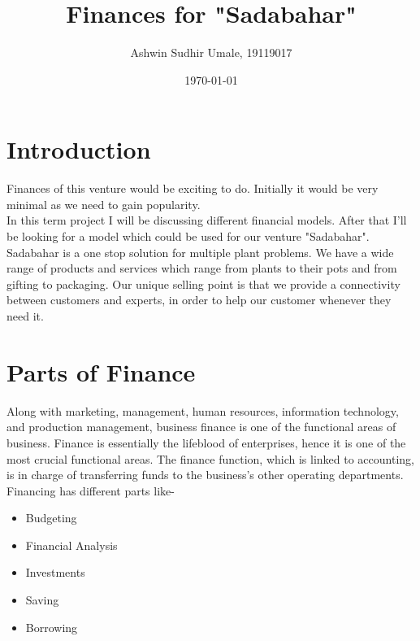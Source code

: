\documentclass{article}
\title{Finances for "Sadabahar"}
\author{Ashwin Sudhir Umale, 19119017}
\date{\today}
\begin{document}
\maketitle


\section{Introduction}

Finances of this venture would be exciting to do. Initially it would be very minimal as we need to gain popularity.
\\
In this term project I will be discussing different financial models. After that I'll be looking for a model which could be used for our venture "Sadabahar".
\\
Sadabahar is a one stop solution for multiple plant problems. We have a wide range of products and services which range from plants to their pots and from gifting to packaging. Our unique selling point is that we provide a connectivity between customers and experts, in order to help our customer whenever they need it.
\section{Parts of Finance}
Along with marketing, management, human resources, information technology, and production management, business finance is one of the functional areas of business. Finance is essentially the lifeblood of enterprises, hence it is one of the most crucial functional areas. The finance function, which is linked to accounting, is in charge of transferring funds to the business's other operating departments.
Financing has different parts like-
\begin{itemize}
    \item Budgeting
    \item Financial Analysis
    \item Investments
    \item Saving 
    \item Borrowing
\end{itemize}
\end{document}
